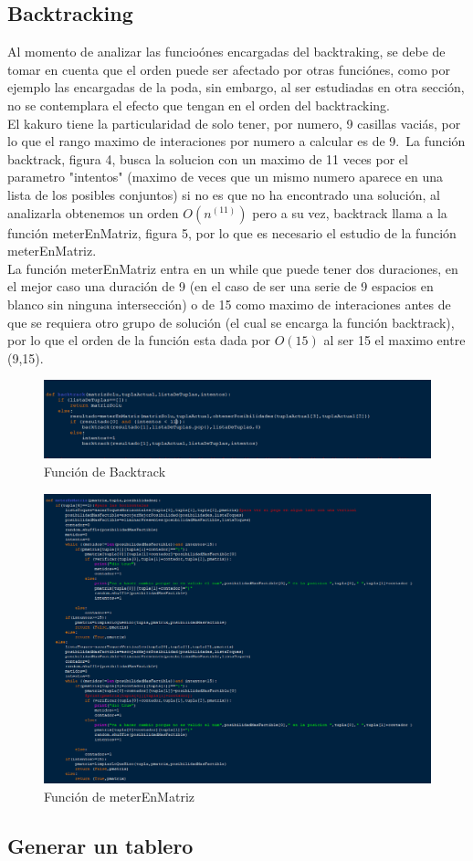 \documentclass[journal]{IEEEtran}
\begin{document}
\subsection{Backtracking}
Al momento de analizar las funcio\'{o}nes encargadas del backtraking, se debe de tomar en cuenta que el orden puede ser afectado por otras funci\'{o}nes, como por ejemplo las encargadas de la poda, sin embargo, al ser estudiadas en otra secci\'{o}n, no se contemplara el efecto que tengan en el orden del backtracking.\\
El kakuro tiene la particularidad de solo tener, por numero, 9 casillas vaci\'{a}s, por lo que el rango maximo de interaciones por numero a calcular es de 9.\ La funci\'{o}n backtrack, figura 4, busca la solucion con un maximo de 11 veces por el parametro "intentos" (maximo de veces que un mismo numero aparece en una lista de los posibles conjuntos) si no es que no ha encontrado una soluci\'{o}n, al analizarla obtenemos un orden $O(n^(11))$ pero a su vez, backtrack llama a la funci\'{o}n meterEnMatriz, figura 5, por lo que es necesario el estudio de la funci\'{o}n meterEnMatriz.
\\
La funci\'{o}n meterEnMatriz entra en un while que puede tener dos duraciones, en el mejor caso una duraci\'{o}n de 9 (en el caso de ser una serie de 9 espacios en blanco sin ninguna intersecci\'{o}n) o de 15 como maximo de interaciones antes de que se requiera otro grupo de soluci\'{o}n (el cual se encarga la funci\'{o}n backtrack), por lo que el orden de la funci\'{o}n esta dada por $O(15)$ al ser 15 el maximo entre (9,15).\\ 
\begin{figure}[h] 
	\centering \includegraphics[width=1\columnwidth]{backtrack_parte1.png}
	\caption{
		\label{fig:samplesetup}
		Función de Backtrack
	}
\end{figure}
\begin{figure}[h] 
	\centering \includegraphics[width=1\columnwidth]{backtrack_parte2.png}
	\caption{
		\label{fig:samplesetup}
		Función de meterEnMatriz
	}
\end{figure}
\subsection{Generar un tablero}
\end{document}
